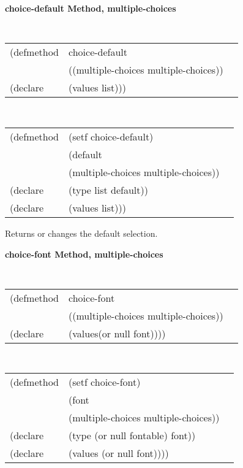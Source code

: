 {\samepage
{\large {\bf choice-default \hfill Method, multiple-choices}}
\begin{flushright} \parbox[t]{6.125in}{
\tt
\begin{tabular}{lll}
\raggedright
(defmethod & choice-default & \\
& ((multiple-choices  multiple-choices)) \\
(declare &(values list)))
\end{tabular}
\rm

}\end{flushright}}

{\samepage
\begin{flushright} \parbox[t]{6.125in}{
\tt
\begin{tabular}{lll}
\raggedright
(defmethod & (setf choice-default) & \\
         & (default \\
         & (multiple-choices multiple-choices)) \\
(declare &(type list  default))\\
(declare & (values list)))
\end{tabular}
\rm
}
\end{flushright}}



\begin{flushright} \parbox[t]{6.125in}{
Returns or changes the default selection.

}\end{flushright}

{\samepage
{\large {\bf choice-font \hfill Method, multiple-choices}}
\begin{flushright} \parbox[t]{6.125in}{
\tt
\begin{tabular}{lll}
\raggedright
(defmethod & choice-font & \\
& ((multiple-choices  multiple-choices)) \\
(declare & (values(or null font))))
\end{tabular}
\rm

}\end{flushright}}

{\samepage
\begin{flushright} \parbox[t]{6.125in}{
\tt
\begin{tabular}{lll}
\raggedright
(defmethod & (setf choice-font) & \\
         & (font \\
         & (multiple-choices multiple-choices)) \\
(declare &(type (or null fontable)  font))\\
(declare & (values (or null font))))
\end{tabular}
\rm
}
\end{flushright}}



